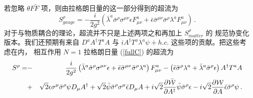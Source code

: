 若忽略 $\theta F \tilde{F}$ 项，则由拉格朗日量的这一部分得到的超流为
$$
S^\rho_{gauge}=-\frac{i}{2g^2}\left(\bar{\lambda}^a \bar{\sigma}^\rho
\sigma^{\mu\nu}\epsilon F^a_{\mu\nu}+\bar{\epsilon}\bar{\sigma}^{\mu\nu} 
\bar{\sigma}^\rho \lambda^a F^a_{\mu\nu}\right)\,.
$$
对于与物质耦合的理论，超流并不只是上述两项之和再加上 $S^\rho_{matter}$ 的
规范协变化版本。我们还预期有来自 $D^a A^\dagger T^a A$
与 $i A^\dagger T^a \lambda^a\psi+h.c.$ 这些项的贡献。把这些考虑在内，
相互作用 $N=1$ 拉格朗日量 (\ref{fullC}) 的超流为
\begin{eqnarray}
S^\rho = &-&\frac{i}{2g^2}\left(\bar{\lambda}^a \bar{\sigma}^\rho
\sigma^{\mu\nu}\epsilon +\bar{\epsilon}\bar{\sigma}^{\mu\nu} 
\bar{\sigma}^\rho \lambda^a\right) F^a_{\mu\nu} -
\left(\bar{\epsilon} \bar{\sigma}^\rho \lambda^a + \bar{\lambda}^a 
\bar{\sigma}^\rho \epsilon\right) A^\dagger T^a A
\nonumber\\
&+& \sqrt{2}\epsilon\sigma^\mu \bar{\sigma}^\rho \psi D_\mu A^\dagger
+\sqrt{2}\bar{\psi}\bar{\sigma}^\rho\sigma^\mu\bar{\epsilon}D_\mu A
+i\sqrt{2}\frac{\partial \bar{\cal W}}{\partial A^\dagger}\bar{\psi}
\bar{\sigma}^\rho\epsilon-i\sqrt{2}\frac{\partial{\cal W}}{\partial A}
\bar{\epsilon}\bar{\sigma}^\rho \psi\,.
\label{N=1sc}
\end{eqnarray}

